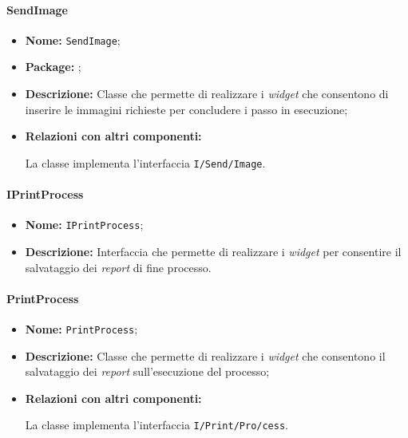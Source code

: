 \paragraph{SendImage}
\begin{flushleft}
\begin{itemize}
\item \textbf{Nome:} \texttt{SendImage};
\item \textbf{Package:} \texttt{\viewUser{}};
\item \textbf{Descrizione:} Classe che permette di realizzare i \textit{widget} che consentono di inserire le immagini richieste per concludere i passo in esecuzione;
\item \textbf{Relazioni con altri componenti:}
\begin{sloppypar}
La classe implementa l'interfaccia \texttt{I\fshyp{}Send\fshyp{}Image}.
\end{sloppypar}
\end{itemize}
\end{flushleft}

\paragraph{IPrintProcess}
\begin{itemize}
\item \textbf{Nome:} \texttt{IPrintProcess};
\item \textbf{Descrizione:} Interfaccia che permette di realizzare i \textit{widget} per consentire il salvataggio dei \textit{report} di fine processo.
\end{itemize}

\paragraph{PrintProcess}
\begin{flushleft}
\begin{itemize}
\item \textbf{Nome:} \texttt{PrintProcess};
\item \textbf{Descrizione:} Classe che permette di realizzare i \textit{widget} che consentono il salvataggio dei \textit{report} sull'esecuzione del processo;
\item \textbf{Relazioni con altri componenti:}
\begin{sloppypar}
La classe implementa l'interfaccia \texttt{I\fshyp{}Print\fshyp{}Pro\fshyp{}cess}.
\end{sloppypar}
\end{itemize}
\end{flushleft}
